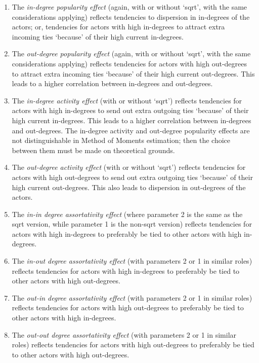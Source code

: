 \documentclass[a4paper,fleqn,11pt]{article}
\newcommand{\+}{\, + \,}
\begin{document}
\begin{enumerate}
\item The \emph{in-degree popularity effect} (again, with or without `sqrt',
     with the same considerations applying)
     reflects tendencies to dispersion in in-degrees of the actors;
     or, tendencies for actors with high in-degrees to attract extra incoming ties
     `because' of their high current in-degrees.
\item The \emph{out-degree popularity effect} (again, with or without `sqrt',
     with the same considerations applying)
     reflects tendencies for
     actors with high out-degrees to attract extra incoming ties
     `because' of their high current out-degrees.
     This leads to a higher correlation between in-degrees and out-degrees.
\item The \emph{in-degree activity effect} (with or without `sqrt')
     reflects tendencies for
     actors with high in-degrees to send out extra outgoing ties
     `because' of their high current in-degrees.
     This leads to a higher correlation between in-degrees and out-degrees.
     The in-degree activity and out-degree popularity effects are
     not distinguishable in Method of Moments estimation; then the choice between them
     must be made on theoretical grounds.
\item The \emph{out-degree activity effect} (with or without `sqrt')
     reflects tendencies for
     actors with high out-degrees to send out extra outgoing ties
     `because' of their high current out-degrees.
     This also leads to dispersion in out-degrees of the actors.
\item The \emph{in-in degree assortativity effect} (where parameter 2 is the same
    as the sqrt version, while parameter 1 is the non-sqrt version)
     reflects tendencies for actors with high in-degrees
     to preferably be tied to other actors with high in-degrees.
\item The \emph{in-out degree assortativity effect} (with parameters
     2 or 1 in similar roles)
     reflects tendencies for actors with high in-degrees
     to preferably be tied to other actors with high out-degrees.
\item The \emph{out-in degree assortativity effect} (with parameters
     2 or 1 in similar roles)
     reflects tendencies for actors with high out-degrees
     to preferably be tied to other actors with high in-degrees.
\item The \emph{out-out degree assortativity effect} (with parameters
     2 or 1 in similar roles)
     reflects tendencies for actors with high out-degrees
     to preferably be tied to other actors with high out-degrees.
\end{enumerate}
\end{document}
